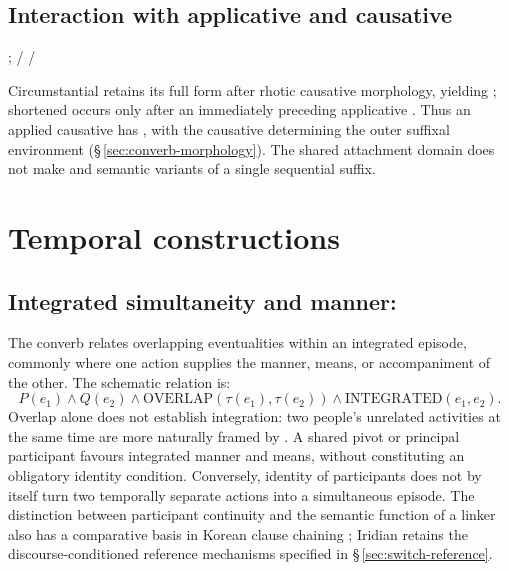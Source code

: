 \subsection{Interaction with applicative and causative}

\pex
\a {} ;  
\a {} /  
\a {} /  
\xe

Circumstantial  retains its full form after rhotic causative
morphology, yielding ; shortened  occurs
only after an immediately preceding applicative . Thus an applied
causative has , with the causative determining the
outer suffixal environment (§\,\ref{sec:converb-morphology}). The shared
attachment domain does not make  and  semantic variants of a
single sequential suffix.

\section{Temporal constructions}\label{sec:temporal}

\subsection{Integrated simultaneity and manner: }
\label{sec:integrated-simultaneity}

The converb  relates overlapping eventualities within an integrated
episode, commonly where one action supplies the manner, means, or accompaniment
of the other. The schematic relation is:
\[
P(e_1)\land Q(e_2)\land
\mathrm{OVERLAP}(\tau(e_1),\tau(e_2))\land\mathrm{INTEGRATED}(e_1,e_2).
\]
Overlap alone does not establish integration: two people's unrelated activities
at the same time are more naturally framed by . A shared pivot or
principal participant favours integrated manner and means, without constituting
an obligatory identity condition. Conversely, identity of participants does not
by itself turn two temporally separate actions into a simultaneous episode.
The distinction between participant continuity and the semantic function of a
linker also has a comparative basis in Korean clause chaining
\cite{choi2020}; Iridian retains the discourse-conditioned reference mechanisms
specified in §\,\ref{sec:switch-reference}.

